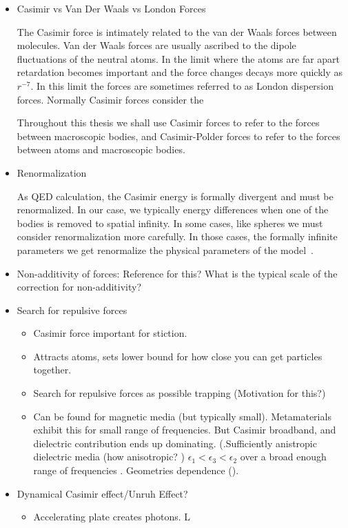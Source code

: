 \begin{itemize}
\item Casimir vs Van Der Waals vs London Forces

The Casimir force is intimately related to the van der Waals forces between molecules.  Van der Waals forces are usually ascribed to the dipole fluctuations of the neutral atoms.  In the limit where the atoms are far apart retardation becomes important and the force changes decays more quickly as $r^{-7}$.  In this limit the forces are sometimes referred to as London dispersion forces.  Normally Casimir forces consider the 

Throughout this thesis we shall use Casimir forces to refer to the forces between macroscopic bodies, and Casimir-Polder forces to refer to the forces between atoms and macroscopic bodies.  

\item Renormalization

As QED calculation, the Casimir energy is formally divergent and must be renormalized.  In our case, we typically energy differences when one of the bodies is removed to spatial infinity.  In some cases, like spheres we must consider renormalization more carefully.  In those cases, the formally infinite parameters we get renormalize the physical parameters of the model~\cite{Milton2001}.  

\item Non-additivity of forces:  Reference for this?  What is the typical scale of the correction for non-additivity?

\item Search for repulsive forces

\begin{itemize}
\item Casimir force important for stiction.
\item Attracts atoms, sets lower bound for how close you can get particles together.
\item Search for repulsive forces as possible trapping (Motivation for this?)
\item Can be found for magnetic media (but typically small).  Metamaterials exhibit this for small range of frequencies.  But Casimir broadband, and dielectric contribution ends up dominating.  (.Sufficiently anistropic dielectric media (how anisotropic? ) $\epsilon_1<\epsilon_3<\epsilon_2$ over a broad enough range of frequencies .   Geometries dependence ().
\end{itemize}
\item Dynamical Casimir effect/Unruh Effect?
\begin{itemize}
  \item Accelerating plate creates photons.  L
\end{itemize}
\end{itemize}

